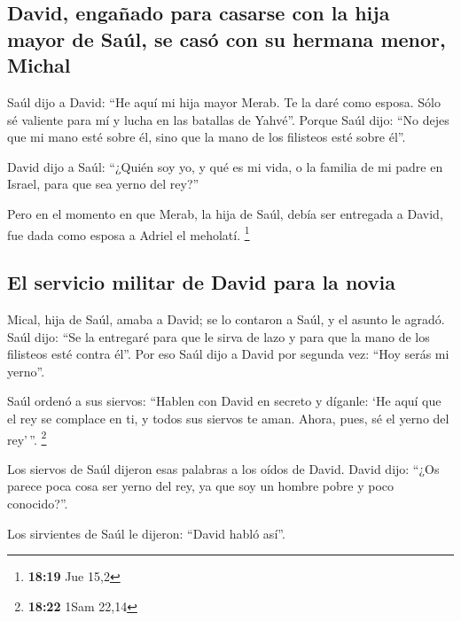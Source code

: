 \hypertarget{david-engauxf1ado-para-casarse-con-la-hija-mayor-de-sauxfal-se-casuxf3-con-su-hermana-menor-michal}{%
\subsection{David, engañado para casarse con la hija mayor de Saúl, se
casó con su hermana menor,
Michal}\label{david-engauxf1ado-para-casarse-con-la-hija-mayor-de-sauxfal-se-casuxf3-con-su-hermana-menor-michal}}

 Saúl dijo a David: ``He aquí mi hija mayor Merab. Te la
daré como esposa. Sólo sé valiente para mí y lucha en las batallas de
Yahvé''. Porque Saúl dijo: ``No dejes que mi mano esté sobre él, sino
que la mano de los filisteos esté sobre él''.

 David dijo a Saúl: ``¿Quién soy yo, y qué es mi vida, o
la familia de mi padre en Israel, para que sea yerno del rey?''

 Pero en el momento en que Merab, la hija de Saúl, debía
ser entregada a David, fue dada como esposa a Adriel el meholatí.
\footnote{\textbf{18:19} Jue 15,2}

\hypertarget{el-servicio-militar-de-david-para-la-novia}{%
\subsection{El servicio militar de David para la
novia}\label{el-servicio-militar-de-david-para-la-novia}}

 Mical, hija de Saúl, amaba a David; se lo contaron a
Saúl, y el asunto le agradó.  Saúl dijo: ``Se la
entregaré para que le sirva de lazo y para que la mano de los filisteos
esté contra él''. Por eso Saúl dijo a David por segunda vez: ``Hoy serás
mi yerno''.

 Saúl ordenó a sus siervos: ``Hablen con David en secreto
y díganle: `He aquí que el rey se complace en ti, y todos sus siervos te
aman. Ahora, pues, sé el yerno del rey'\,''. \footnote{\textbf{18:22}
  1Sam 22,14}

 Los siervos de Saúl dijeron esas palabras a los oídos de
David. David dijo: ``¿Os parece poca cosa ser yerno del rey, ya que soy
un hombre pobre y poco conocido?''.

 Los sirvientes de Saúl le dijeron: ``David habló así''.

